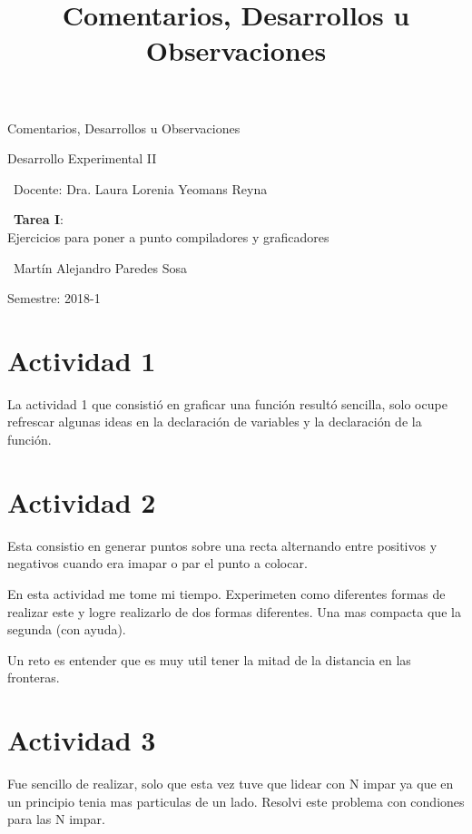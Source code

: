 \documentclass[12pt,letterpaper]{article}
\title{ Comentarios, Desarrollos u Observaciones  }
\begin{document}
\begin{titlepage}
	\centering
    \vspace*{2cm}
	{\Huge Comentarios, Desarrollos u Observaciones \par}
	\vfill
	{\Large Desarrollo Experimental II \par}
	\vfill
	{\large\ Docente: Dra. Laura Lorenia Yeomans Reyna \par}
    \vfill
    {\large\ \textbf{Tarea I}:\\ Ejercicios para poner a punto compiladores y graficadores \par}
    \vfill
    {\large\ Martín Alejandro Paredes Sosa \par}
	\vfill
	{\large Semestre: 2018-1\par}
\end{titlepage}
\section*{Actividad 1}
La actividad 1 que consistió en graficar una función resultó sencilla, solo ocupe refrescar algunas ideas en la declaración de variables y la declaración de la función.

\section{Actividad 2}
Esta consistio en generar puntos sobre una recta alternando entre positivos y negativos cuando era imapar o par el punto a colocar.

En esta actividad me tome mi tiempo. Experimeten como diferentes formas de realizar este y logre realizarlo de dos formas diferentes. Una mas compacta que la segunda (con ayuda).

Un reto es entender que es muy util tener la mitad de la distancia en las fronteras.

\section{Actividad 3}
Fue sencillo de realizar, solo que esta vez tuve que lidear con N impar ya que en un principio tenia mas particulas de un lado. Resolvi este problema con condiones para las N impar.
\end{document}
